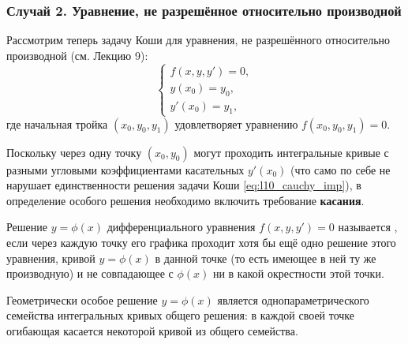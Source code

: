 \subsubsection{Случай 2. Уравнение, не разрешённое относительно производной}

Рассмотрим теперь задачу Коши для уравнения, не разрешённого относительно
производной (см. Лекцию 9):
\begin{equation} \label{eq:l10_cauchy_imp}
    \begin{cases}
        f(x, y, y') = 0, \\
        y(x_0) = y_0, \\
        y'(x_0) = y_1,
    \end{cases} \tag{2}
\end{equation}
где начальная тройка $(x_0, y_0, y_1)$ удовлетворяет уравнению
$f(x_0, y_0, y_1) = 0$.

Поскольку через одну точку $(x_0, y_0)$ могут проходить интегральные кривые с
разными угловыми коэффициентами касательных $y'(x_0)$ (что само по себе не
нарушает единственности решения задачи Коши \eqref{eq:l10_cauchy_imp}), в
определение особого решения необходимо включить требование \textbf{касания}.

\begin{definition}
    Решение $y = \phi(x)$ дифференциального уравнения $f(x, y, y') = 0$
    называется , если через каждую точку его графика
    проходит хотя бы ещё одно решение этого уравнения, 
    кривой $y = \phi(x)$ в данной точке (то есть имеющее в ней ту же
    производную) и не совпадающее с $\phi(x)$ ни в какой окрестности этой
    точки.
\end{definition}

Геометрически особое решение $y = \phi(x)$ является 
однопараметрического семейства интегральных кривых общего решения: в каждой
своей точке огибающая касается некоторой кривой из общего семейства.

